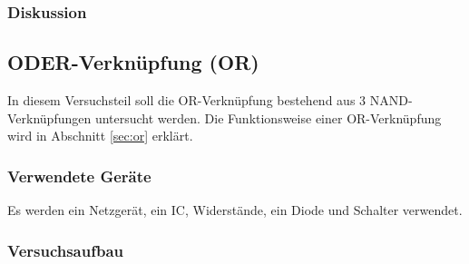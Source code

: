 \documentclass[12pt,a4paper]{article}
\begin{document}
\subsubsection*{Diskussion}

\subsection{ODER-Verknüpfung (OR)}

In diesem Versuchsteil soll die OR-Verknüpfung bestehend aus 3 NAND-Verknüpfungen untersucht werden. Die Funktionsweise einer OR-Verknüpfung wird in Abschnitt \ref{sec:or} erklärt.

\subsubsection*{Verwendete Geräte}

Es werden ein Netzgerät, ein IC, Widerstände, ein Diode und Schalter verwendet.


\subsubsection*{Versuchsaufbau}
\end{document}
